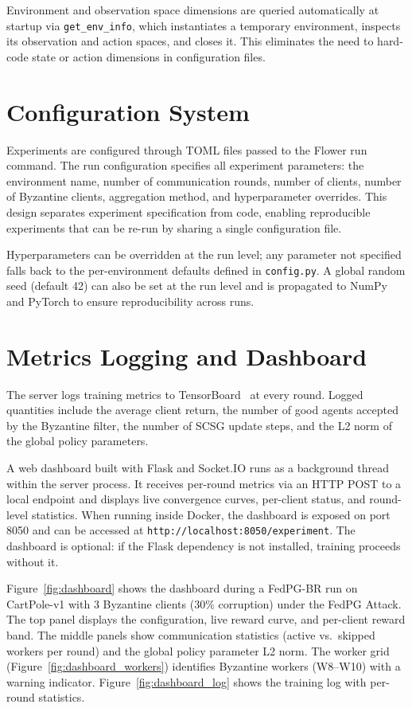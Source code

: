 \documentclass[a4paper, oneside]{discothesis}
\begin{document}
Environment and observation space dimensions are queried automatically at startup via \texttt{get\_env\_info}, which instantiates a temporary environment, inspects its observation and action spaces, and closes it. This eliminates the need to hard-code state or action dimensions in configuration files.

\section{Configuration System}
\label{sec:config}

Experiments are configured through TOML files passed to the Flower run command. The run configuration specifies all experiment parameters: the environment name, number of communication rounds, number of clients, number of Byzantine clients, aggregation method, and hyperparameter overrides. This design separates experiment specification from code, enabling reproducible experiments that can be re-run by sharing a single configuration file.

Hyperparameters can be overridden at the run level; any parameter not specified falls back to the per-environment defaults defined in \texttt{config.py}. A global random seed (default 42) can also be set at the run level and is propagated to NumPy and PyTorch to ensure reproducibility across runs.

\section{Metrics Logging and Dashboard}
\label{sec:monitoring}

The server logs training metrics to TensorBoard~\cite{TensorBoard} at every round. Logged quantities include the average client return, the number of good agents accepted by the Byzantine filter, the number of SCSG update steps, and the L2 norm of the global policy parameters.

A web dashboard built with Flask and Socket.IO runs as a background thread within the server process. It receives per-round metrics via an HTTP POST to a local endpoint and displays live convergence curves, per-client status, and round-level statistics. When running inside Docker, the dashboard is exposed on port 8050 and can be accessed at \texttt{http://localhost:8050/experiment}. The dashboard is optional: if the Flask dependency is not installed, training proceeds without it.

Figure~\ref{fig:dashboard} shows the dashboard during a FedPG-BR run on CartPole-v1 with 3 Byzantine clients (30\% corruption) under the FedPG Attack. The top panel displays the configuration, live reward curve, and per-client reward band. The middle panels show communication statistics (active vs.\ skipped workers per round) and the global policy parameter L2 norm. The worker grid (Figure~\ref{fig:dashboard_workers}) identifies Byzantine workers (W8--W10) with a warning indicator. Figure~\ref{fig:dashboard_log} shows the training log with per-round statistics.
\end{document}
